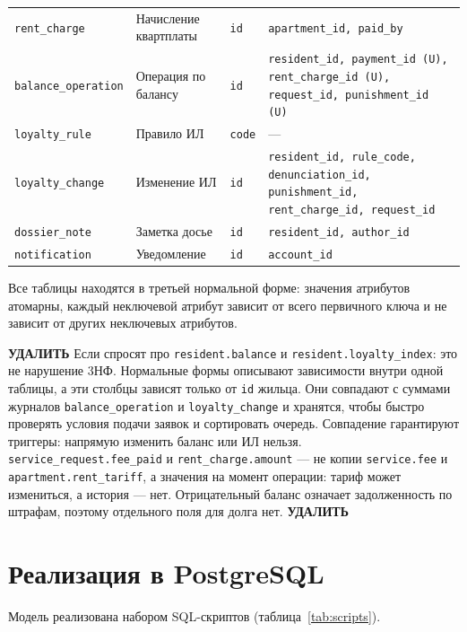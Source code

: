 \documentclass[12pt,a4paper]{article}
\begin{document}
\begin{longtable}{L{30.5mm} L{31.4mm} L{35.2mm} L{55.2mm}}
\texttt{rent\_\allowbreak{}charge} & Начисление квартплаты & \texttt{id} & \texttt{apartment\_\allowbreak{}id, paid\_\allowbreak{}by} \\
\texttt{balance\_\allowbreak{}operation} & Операция по балансу & \texttt{id} & \texttt{resident\_\allowbreak{}id, payment\_\allowbreak{}id (U), rent\_\allowbreak{}charge\_\allowbreak{}id (U), request\_\allowbreak{}id, punishment\_\allowbreak{}id (U)} \\
\texttt{loyalty\_\allowbreak{}rule} & Правило ИЛ & \texttt{code} & — \\
\texttt{loyalty\_\allowbreak{}change} & Изменение ИЛ & \texttt{id} & \texttt{resident\_\allowbreak{}id, rule\_\allowbreak{}code, denunciation\_\allowbreak{}id, punishment\_\allowbreak{}id, rent\_\allowbreak{}charge\_\allowbreak{}id, request\_\allowbreak{}id} \\
\texttt{dossier\_\allowbreak{}note} & Заметка досье & \texttt{id} & \texttt{resident\_\allowbreak{}id, author\_\allowbreak{}id} \\
\texttt{notification} & Уведомление & \texttt{id} & \texttt{account\_\allowbreak{}id} \\
\end{longtable}
Все таблицы находятся в третьей нормальной форме: значения атрибутов атомарны, каждый
неключевой атрибут зависит от всего первичного ключа и не зависит от других неключевых атрибутов.

\textbf{УДАЛИТЬ} Если спросят про \texttt{resident.\allowbreak{}balance} и \texttt{resident.\allowbreak{}loyalty\_\allowbreak{}index}: это не нарушение 3НФ. Нормальные формы описывают зависимости внутри одной таблицы, а эти столбцы зависят только от \texttt{id} жильца. Они совпадают с суммами журналов \texttt{balance\_\allowbreak{}operation} и \texttt{loyalty\_\allowbreak{}change} и хранятся, чтобы быстро проверять условия подачи заявок и сортировать очередь. Совпадение гарантируют триггеры: напрямую изменить баланс или ИЛ нельзя. \texttt{service\_\allowbreak{}request.\allowbreak{}fee\_\allowbreak{}paid} и \texttt{rent\_\allowbreak{}charge.\allowbreak{}amount} --- не копии \texttt{service.\allowbreak{}fee} и \texttt{apartment.\allowbreak{}rent\_\allowbreak{}tariff}, а значения на момент операции: тариф может измениться, а история --- нет. Отрицательный баланс означает задолженность по штрафам, поэтому отдельного поля для долга нет. \textbf{УДАЛИТЬ}
\section{Реализация в PostgreSQL}
Модель реализована набором SQL-скриптов (таблица~\ref{tab:scripts}).
\end{document}
